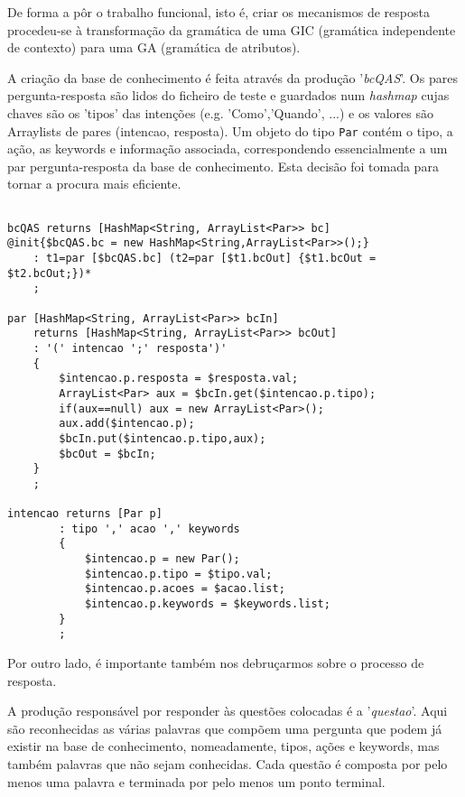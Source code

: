\qquad De forma a pôr o trabalho funcional, isto é, criar os mecanismos de resposta procedeu-se à transformação da gramática de uma GIC (gramática independente de contexto) para uma GA (gramática de atributos).

A criação da base de conhecimento é feita através da produção '\textit{bcQAS}'. Os pares pergunta-resposta são lidos do ficheiro de teste e guardados num \textit{hashmap} cujas chaves são os 'tipos' das intenções (e.g. 'Como','Quando', ...) e os valores são Arraylists de pares (intencao, resposta). Um objeto do tipo \texttt{Par} contém o tipo, a ação, as keywords e informação associada, correspondendo essencialmente a um par pergunta-resposta da base de conhecimento. 
Esta decisão foi tomada para tornar a procura mais eficiente.

\begin{verbatim}

bcQAS returns [HashMap<String, ArrayList<Par>> bc]
@init{$bcQAS.bc = new HashMap<String,ArrayList<Par>>();}
    : t1=par [$bcQAS.bc] (t2=par [$t1.bcOut] {$t1.bcOut = $t2.bcOut;})*
    ;

par [HashMap<String, ArrayList<Par>> bcIn] 
    returns [HashMap<String, ArrayList<Par>> bcOut]
    : '(' intencao ';' resposta')' 
    {
        $intencao.p.resposta = $resposta.val;
        ArrayList<Par> aux = $bcIn.get($intencao.p.tipo);
        if(aux==null) aux = new ArrayList<Par>();
        aux.add($intencao.p);
        $bcIn.put($intencao.p.tipo,aux);
        $bcOut = $bcIn;
    }
    ;

intencao returns [Par p]
        : tipo ',' acao ',' keywords
        {
            $intencao.p = new Par();
            $intencao.p.tipo = $tipo.val;
            $intencao.p.acoes = $acao.list;
            $intencao.p.keywords = $keywords.list;
        }
        ;

\end{verbatim}

Por outro lado, é importante também nos debruçarmos sobre o processo de resposta.

A produção responsável por responder às questões colocadas é a '\textit{questao}'. Aqui são reconhecidas as várias palavras que compõem uma pergunta que podem já existir na base de conhecimento, nomeadamente, tipos, ações e keywords, mas também palavras que não sejam conhecidas. Cada questão é composta por pelo menos uma palavra e terminada por pelo menos um ponto terminal.

